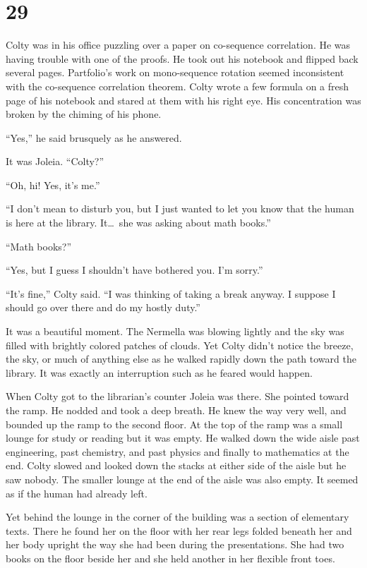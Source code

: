 
\chapter{29}

Colty was in his office puzzling over a paper on co-sequence correlation. He was having trouble
with one of the proofs. He took out his notebook and flipped back several pages. Partfolio's
work on mono-sequence rotation seemed inconsistent with the co-sequence correlation theorem.
Colty wrote a few formula on a fresh page of his notebook and stared at them with his right eye.
His concentration was broken by the chiming of his phone.

``Yes,'' he said brusquely as he answered.

It was Joleia. ``Colty?''

``Oh, hi! Yes, it's me.''

``I don't mean to disturb you, but I just wanted to let you know that the human is here at the
library. It\ldots\ she was asking about math books.''

``Math books?''

``Yes, but I guess I shouldn't have bothered you. I'm sorry.''

``It's fine,'' Colty said. ``I was thinking of taking a break anyway. I suppose I should go over
there and do my hostly duty.''

It was a beautiful moment. The Nermella was blowing lightly and the sky was filled with brightly
colored patches of clouds. Yet Colty didn't notice the breeze, the sky, or much of anything else
as he walked rapidly down the path toward the library. It was exactly an interruption such as he
feared would happen.

When Colty got to the librarian's counter Joleia was there. She pointed toward the ramp. He
nodded and took a deep breath. He knew the way very well, and bounded up the ramp to the second
floor. At the top of the ramp was a small lounge for study or reading but it was empty. He
walked down the wide aisle past engineering, past chemistry, and past physics and finally to
mathematics at the end. Colty slowed and looked down the stacks at either side of the aisle but
he saw nobody. The smaller lounge at the end of the aisle was also empty. It seemed as if the
human had already left.

Yet behind the lounge in the corner of the building was a section of elementary texts. There he
found her on the floor with her rear legs folded beneath her and her body upright the way she
had been during the presentations. She had two books on the floor beside her and she held
another in her flexible front toes.

